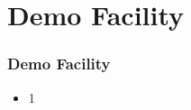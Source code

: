 \section{Demo Facility}
\begin{frame}\frametitle{Demo Facility}
	\begin{itemize}
		\item 1
	\end{itemize}
\end{frame}